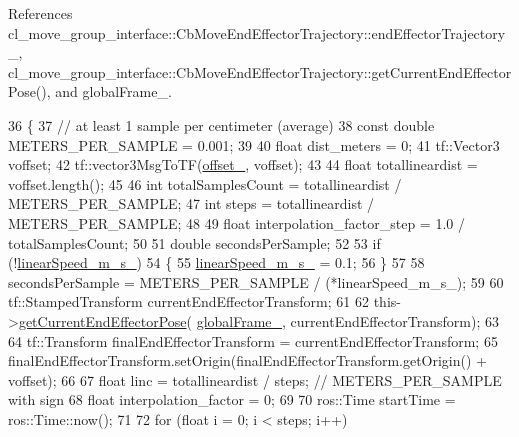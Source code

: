 References cl\+\_\+move\+\_\+group\+\_\+interface\+::\+Cb\+Move\+End\+Effector\+Trajectory\+::end\+Effector\+Trajectory\+\_\+, cl\+\_\+move\+\_\+group\+\_\+interface\+::\+Cb\+Move\+End\+Effector\+Trajectory\+::get\+Current\+End\+Effector\+Pose(), and global\+Frame\+\_\+.


\begin{DoxyCode}
36         \{
37             \textcolor{comment}{// at least 1 sample per centimeter (average)}
38             \textcolor{keyword}{const} \textcolor{keywordtype}{double} METERS\_PER\_SAMPLE = 0.001;
39 
40             \textcolor{keywordtype}{float} dist\_meters = 0;
41             tf::Vector3 voffset;
42             tf::vector3MsgToTF(\hyperlink{classcl__move__group__interface_1_1CbMoveCartesianRelative2_a38e3c82a5fac0028a1d74eba4e478181}{offset\_}, voffset);
43 
44             \textcolor{keywordtype}{float} totallineardist = voffset.length();
45 
46             \textcolor{keywordtype}{int} totalSamplesCount = totallineardist / METERS\_PER\_SAMPLE;
47             \textcolor{keywordtype}{int} steps = totallineardist / METERS\_PER\_SAMPLE;
48 
49             \textcolor{keywordtype}{float} interpolation\_factor\_step = 1.0 / totalSamplesCount;
50 
51             \textcolor{keywordtype}{double} secondsPerSample;
52 
53             \textcolor{keywordflow}{if} (!\hyperlink{classcl__move__group__interface_1_1CbMoveCartesianRelative2_abad921ee22381db86544263e2f8ff03a}{linearSpeed\_m\_s\_})
54             \{
55                 \hyperlink{classcl__move__group__interface_1_1CbMoveCartesianRelative2_abad921ee22381db86544263e2f8ff03a}{linearSpeed\_m\_s\_} = 0.1;
56             \}
57 
58             secondsPerSample = METERS\_PER\_SAMPLE / (*linearSpeed\_m\_s\_);
59 
60             tf::StampedTransform currentEndEffectorTransform;
61 
62             this->\hyperlink{classcl__move__group__interface_1_1CbMoveEndEffectorTrajectory_a56945ccfff51e3eb9ec9c2edcfa132af}{getCurrentEndEffectorPose}(
      \hyperlink{classcl__move__group__interface_1_1CbMoveCartesianRelative2_ac33f1b3f077e191cda9b0b5f9f8c1f34}{globalFrame\_}, currentEndEffectorTransform);
63 
64             tf::Transform finalEndEffectorTransform = currentEndEffectorTransform;
65             finalEndEffectorTransform.setOrigin(finalEndEffectorTransform.getOrigin() + voffset);
66 
67             \textcolor{keywordtype}{float} linc = totallineardist / steps; \textcolor{comment}{// METERS\_PER\_SAMPLE with sign}
68             \textcolor{keywordtype}{float} interpolation\_factor = 0;
69 
70             ros::Time startTime = ros::Time::now();
71 
72             \textcolor{keywordflow}{for} (\textcolor{keywordtype}{float} i = 0; i < steps; i++)

\end{DoxyCode}
